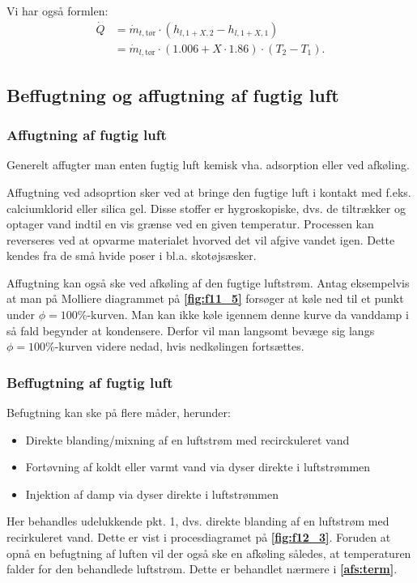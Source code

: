 Vi har også formlen:
\begin{align*}
  \dot{Q} &= \dot{m}_{t, \text{tør}} \cdot \left( h_{l,1 + X,2} - h_{l,1 + X,1} \right) \\
          &= \dot{m}_{l ,\text{tør}} \cdot \left( \num{1,006} + X \cdot \num{1,86}  \right) \cdot \left( T_2 - T_1 \right)
.\end{align*}


\subsection{Beffugtning og affugtning af fugtig luft}

\subsubsection{Affugtning af fugtig luft}
Generelt affugter man enten fugtig luft kemisk vha. adsorption eller ved afkøling.

Affugtning ved adsoprtion sker ved at bringe den fugtige luft i kontakt med f.eks. calciumklorid eller silica gel. Disse stoffer er hygroskopiske, dvs. de tiltrækker og optager vand indtil en vis grænse ved en given temperatur. Processen kan reverseres ved at opvarme materialet hvorved det vil afgive vandet igen. Dette kendes fra de små hvide poser i bl.a. skotøjsæsker.

Affugtning kan også ske ved afkøling af den fugtige luftstrøm. Antag eksempelvis at man på Molliere diagrammet på \textbf{\autoref{fig:f11_5}} forsøger at køle ned til et punkt under $\phi = 100\%$-kurven. Man kan ikke køle igennem denne kurve da vanddamp i så fald begynder at kondensere. Derfor vil man langsomt bevæge sig langs $\phi=100\%$-kurven videre nedad, hvis nedkølingen fortsættes.

\subsubsection{Beffugtning af fugtig luft}
Befugtning kan ske på flere måder, herunder:
\begin{itemize}
  \item Direkte blanding/mixning af en luftstrøm med recirckuleret vand
  \item Fortøvning af koldt eller varmt vand via dyser direkte i luftstrømmen
  \item Injektion af damp via dyser direkte i luftstrømmen
\end{itemize}
Her behandles udelukkende pkt. 1, dvs. direkte blanding af en luftstrøm med recirkuleret vand. Dette er vist i procesdiagramet på \textbf{\autoref{fig:f12_3}}. Foruden at opnå en befugtning af luften vil der også ske en afkøling således, at temperaturen falder for den behandlede luftstrøm. Dette er behandlet nærmere i \textbf{\autoref{afs:term}}.

